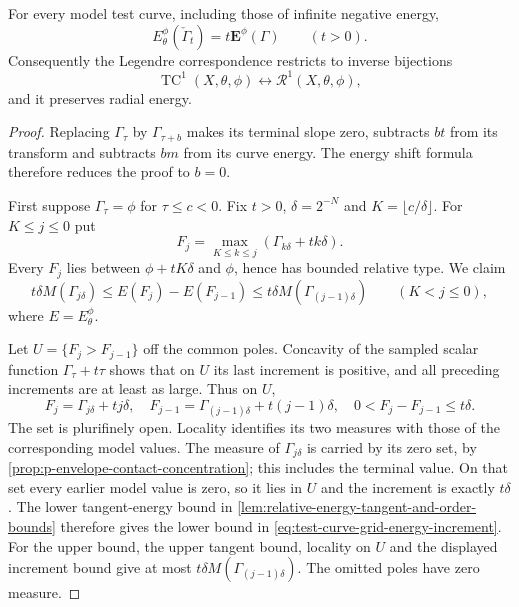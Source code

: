 \begin{theorem}\label{thm:test-curve-ray-energy-identity}
For every model test curve, including those of infinite negative energy,
\[
 E_\theta^\phi(\check\Gamma_t)=t\mathbf E^\phi(\Gamma)
                                        \qquad(t>0).
\]
Consequently the Legendre correspondence restricts to inverse bijections
\[
 \operatorname{TC}^1(X,\theta,\phi)
                   \longleftrightarrow\mathcal R^1(X,\theta,\phi),
\]
and it preserves radial energy.
\end{theorem}
\begin{proof}
Replacing $\Gamma_\tau$ by $\Gamma_{\tau+b}$ makes its terminal slope zero, subtracts $bt$ from its transform and subtracts $bm$ from its curve energy. The energy shift formula therefore reduces the proof to $b=0$.

First suppose $\Gamma_\tau=\phi$ for $\tau\leq c<0$. Fix $t>0$, $\delta=2^{-N}$ and $K=\lfloor c/\delta\rfloor$. For $K\leq j\leq0$ put
\[
 F_j=\max_{K\leq k\leq j}(\Gamma_{k\delta}+tk\delta).
\]
Every $F_j$ lies between $\phi+tK\delta$ and $\phi$, hence has bounded relative type. We claim
\begin{equation}\label{eq:test-curve-grid-energy-increment}
 t\delta M(\Gamma_{j\delta})
       \leq E(F_j)-E(F_{j-1})
       \leq t\delta M(\Gamma_{(j-1)\delta})
                                \qquad(K<j\leq0),
\end{equation}
where $E=E_\theta^\phi$.

Let $U=\{F_j>F_{j-1}\}$ off the common poles. Concavity of the sampled scalar function $\Gamma_\tau+t\tau$ shows that on $U$ its last increment is positive, and all preceding increments are at least as large. Thus on $U$,
\[
 F_j=\Gamma_{j\delta}+tj\delta,\quad
 F_{j-1}=\Gamma_{(j-1)\delta}+t(j-1)\delta,\quad
                  0<F_j-F_{j-1}\leq t\delta.
\]
The set is plurifinely open. Locality identifies its two measures with those of the corresponding model values. The measure of $\Gamma_{j\delta}$ is carried by its zero set, by \cref{prop:p-envelope-contact-concentration}; this includes the terminal value. On that set every earlier model value is zero, so it lies in $U$ and the increment is exactly $t\delta$. The lower tangent-energy bound in \cref{lem:relative-energy-tangent-and-order-bounds} therefore gives the lower bound in \eqref{eq:test-curve-grid-energy-increment}. For the upper bound, the upper tangent bound, locality on $U$ and the displayed increment bound give at most $t\delta M(\Gamma_{(j-1)\delta})$. The omitted poles have zero measure.


\end{proof}

